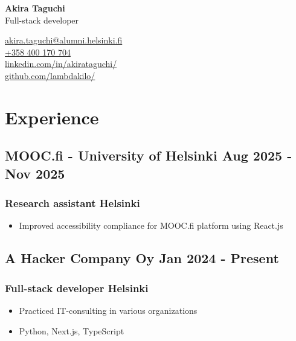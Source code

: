\documentclass[12pt]{article} %
\begin{document}
\begin{center}
  \begin{minipage}{0.5\textwidth}
    {\Huge\bfseries
    Akira Taguchi %
      } \\ \medskip
    Full-stack developer %
  \end{minipage} \hfill
  \begin{minipage}{0.4\textwidth}
    \raggedleft
    \href{mailto:akira.taguchi@alumni.helsinki.fi}{akira.taguchi@alumni.helsinki.fi} \\
    \href{tel:+358400170704}{+358 400 170 704} \\
    \href{https://www.linkedin.com/in/akirataguchi/}{linkedin.com/in/akirataguchi/} \\
    \href{https://github.com/lambdakilo/}{github.com/lambdakilo/}
  \end{minipage}
\end{center}

\section{Experience}
\subsection{MOOC.fi - University of Helsinki \hfill Aug 2025 - Nov 2025}
\subsubsection{Research assistant \hfill  Helsinki}
\begin{itemize}
  \item Improved accessibility compliance for MOOC.fi platform using React.js
\end{itemize}

\subsection{A Hacker Company Oy \hfill Jan 2024 - Present}
\subsubsection{Full-stack developer \hfill  Helsinki}
\begin{itemize}
  \item Practiced IT-consulting in various organizations
  \item Python, Next.js, TypeScript
\end{itemize}
\end{document}
